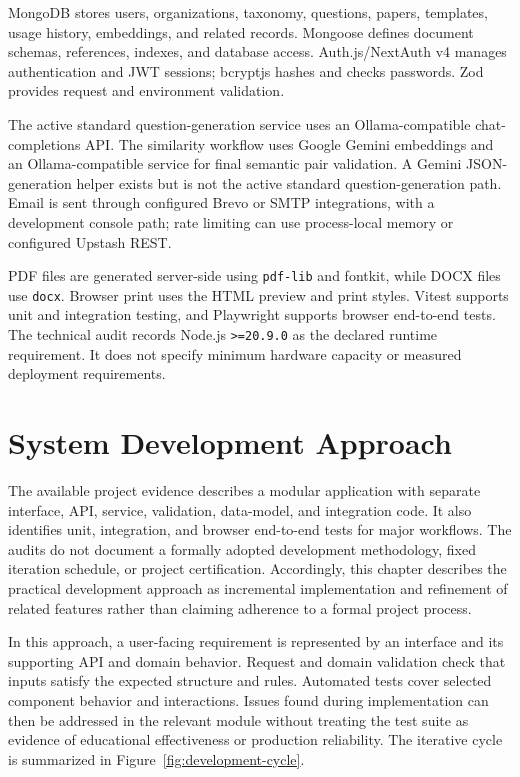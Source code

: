 MongoDB stores users, organizations, taxonomy, questions, papers, templates, usage history, embeddings, and related records. Mongoose defines document schemas, references, indexes, and database access. Auth.js/NextAuth v4 manages authentication and JWT sessions; bcryptjs hashes and checks passwords. Zod provides request and environment validation.

The active standard question-generation service uses an Ollama-compatible chat-completions API. The similarity workflow uses Google Gemini embeddings and an Ollama-compatible service for final semantic pair validation. A Gemini JSON-generation helper exists but is not the active standard question-generation path. Email is sent through configured Brevo or SMTP integrations, with a development console path; rate limiting can use process-local memory or configured Upstash REST.

PDF files are generated server-side using \texttt{pdf-lib} and fontkit, while DOCX files use \texttt{docx}. Browser print uses the HTML preview and print styles. Vitest supports unit and integration testing, and Playwright supports browser end-to-end tests. The technical audit records Node.js \texttt{>=20.9.0} as the declared runtime requirement. It does not specify minimum hardware capacity or measured deployment requirements.

\section{System Development Approach}

The available project evidence describes a modular application with separate interface, API, service, validation, data-model, and integration code. It also identifies unit, integration, and browser end-to-end tests for major workflows. The audits do not document a formally adopted development methodology, fixed iteration schedule, or project certification. Accordingly, this chapter describes the practical development approach as incremental implementation and refinement of related features rather than claiming adherence to a formal project process.

In this approach, a user-facing requirement is represented by an interface and its supporting API and domain behavior. Request and domain validation check that inputs satisfy the expected structure and rules. Automated tests cover selected component behavior and interactions. Issues found during implementation can then be addressed in the relevant module without treating the test suite as evidence of educational effectiveness or production reliability. The iterative cycle is summarized in Figure~\ref{fig:development-cycle}.

